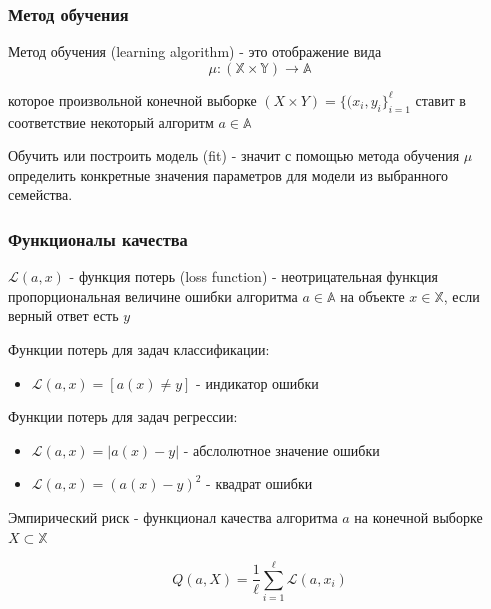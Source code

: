 \documentclass{beamer}
\begin{document}
	\begin{frame}
		\frametitle{Метод обучения}
		
		Метод обучения (learning algorithm) - это отображение вида
		$$
		\mu : (\mathbb{X} \times \mathbb{Y}) \to \mathbb{A}
		$$
		
		которое произвольной конечной выборке $(X \times Y) = \{(x_i, y_i\}_{i=1}^{\ell}$ ставит в соответствие 
		некоторый алгоритм $a \in \mathbb{A}$
		
		\vspace{15}
		
		Обучить или построить модель (fit) - значит с помощью метода обучения $\mu$ определить конкретные значения параметров для модели из выбранного семейства.
	\end{frame}


	\begin{frame}
		\frametitle{Функционалы качества}
		
		$\mathcal{L}(a, x)$ - функция потерь (loss function)  - неотрицательная функция пропорциональная величине ошибки алгоритма $a \in \mathbb{A}$ на объекте $x \in \mathbb{X}$, если верный ответ есть $y$
		
		\vspace{5}
		
		Функции потерь для задач классификации:
		\begin{itemize}
			\item $\mathcal{L}(a, x) = [a(x) \not= y]$ - индикатор ошибки
		\end{itemize}
		
		Функции потерь для задач регрессии:
		\begin{itemize}
			\item $\mathcal{L}(a, x) = |a(x) - y|$ - абслолютное значение ошибки
			\item $\mathcal{L}(a, x) = (a(x) - y)^2$ - квадрат ошибки
		\end{itemize}
		
		\vspace{5}
		
		Эмпирический риск - функционал качества алгоритма $a$ на конечной выборке $X \subset \mathbb{X}$
		
		$$
		Q(a, X) = \frac{1}{\ell} \sum_{i=1}^{\ell} \mathcal{L}(a, x_i)
		$$
	\end{frame}		
		
\end{document}
